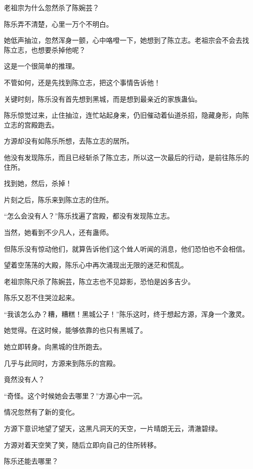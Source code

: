
\begin{this_body}



老祖宗为什么忽然杀了陈婉芸？

陈乐弄不清楚，心里一万个不明白。

她低声抽泣，忽然浑身一颤，心中咯噔一下，她想到了陈立志。老祖宗会不会去找陈立志，也想要杀掉他呢？

这是一个很简单的推理。

不管如何，还是先找到陈立志，把这个事情告诉他！

关键时刻，陈乐没有首先想到黑城，而是想到最亲近的家族蛊仙。

陈乐惊觉过来，止住抽泣，连忙站起身来，仍旧催动着仙道杀招，隐藏身形，向陈立志的宫殿跑去。

方源却没有如陈乐所想，去陈立志的居所。

他没有发现陈乐，而且已经斩杀了陈立志，所以这一次最后的行动，是前往陈乐的住所。

找到她，然后，杀掉！

片刻之后，陈乐来到陈立志的住所。

“怎么会没有人？”陈乐找遍了宫殿，都没有发现陈立志。

当然，她看到不少凡人，还有蛊师。

但陈乐没有惊动他们，就算告诉他们这个耸人听闻的消息，他们恐怕也不会相信。

望着空荡荡的大殿，陈乐心中再次涌现出无限的迷茫和慌乱。

老祖宗陈尺杀了陈婉芸，陈立志也不见踪影，恐怕是凶多吉少。

陈乐又忍不住哭泣起来。

“我该怎么办？糟，糟糕！黑城公子！”陈乐这时，终于想起方源，浑身一个激灵。

她觉得。在这时候，能够依靠的也只有黑城了。

她立即转身。向黑城的住所跑去。

几乎与此同时，方源来到陈乐的宫殿。

竟然没有人？

“奇怪。这个时候她会去哪里？”方源心中一沉。

情况忽然有了新的变化。

方源下意识地望了望天，这黑凡洞天的天空，一片晴朗无云，清澈碧绿。

方源对着天空笑了笑，随后立即向自己的住所转移。

陈乐还能去哪里？


\end{this_body}
